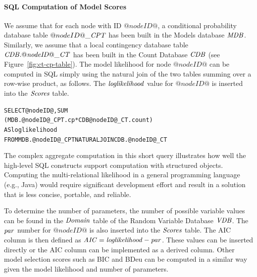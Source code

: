 \documentclass{acm_proc_article-sp}
\newcommand{\ct}{\mathit{ct}}
\begin{document}
\paragraph{SQL Computation of Model Scores} We assume that for each node with ID $@nodeID@$, a conditional probability database table $@nodeID@\_\it{CPT}$ has been built in the Models database $\it{MDB}$. Similarly, we assume that
a local contingency database table $\it{CDB}.@nodeID@\_\it{CT}$ has been built in the Count Database $\it{CDB}$ (see Figure~\ref{fig:ct-cp-table}). The model likelihood for node $@nodeID@$ can be computed in SQL simply using the natural join of the two tables summing over a row-wise product, as follows. The $\it{loglikelihood}$ value for $@nodeID@$ is inserted into the $\it{Scores}$ table. 
\begin{alltt}
SELECT @nodeID@,  SUM
(MDB.@nodeID@\_CPT.cp * CDB@nodeID@\_CT.count) 
AS loglikelihood
FROM MDB.@nodeID@\_CPT NATURAL JOIN CDB.@nodeID@\_CT
\end{alltt}

The complex aggregate computation in this short query illustrates how well the high-level SQL constructs support computation with structured objects. Computing the multi-relational likelihood in a general programming language (e.g., Java) would require significant development effort and result in a solution that is less concise, portable, and reliable.

To determine the number of parameters, the number of possible variable values can be found in the $\it{Domain}$ table of the Random Variable Database $\it{VDB}$.  The $\mathit{par}$ number for $@nodeID@$ is also inserted into the $\it{Scores}$ table. The AIC column is then defined as $\mathit{AIC} = \it{loglikelihood} - \mathit{par}$. These values can be inserted directly or the AIC column can be implemented as a derived column. %
%
Other model selection scores such as BIC and BDeu can be computed in a similar way given the model likelihood and number of parameters.
\end{document}
